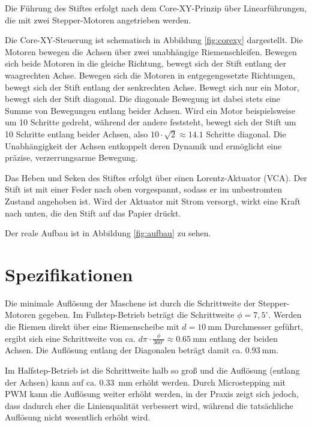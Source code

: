 \documentclass[a4paper,twoside,12pt,DIV=13,BCOR=5mm,numbers=noenddot,cleardoublepage=empty]{scrbook}
\begin{document}
Die Führung des Stiftes erfolgt nach dem Core-XY-Prinzip über Linearführungen, die mit zwei Stepper-Motoren angetrieben werden.

Die Core-XY-Steuerung ist schematisch in Abbildung \ref{fig:corexy} dargestellt. Die Motoren bewegen die Achsen über zwei unabhängige Riemenschleifen.
Bewegen sich beide Motoren in die gleiche Richtung, bewegt sich der Stift entlang der waagrechten Achse.
Bewegen sich die Motoren in entgegengesetzte Richtungen, bewegt sich der Stift entlang der senkrechten Achse.
Bewegt sich nur ein Motor, bewegt sich der Stift diagonal.
Die diagonale Bewegung ist dabei stets eine Summe von Bewegungen entlang beider Achsen.
Wird ein Motor beispielsweise um 10 Schritte gedreht, während der andere feststeht, bewegt sich der Stift um 10 Schritte entlang beider Achsen,
also $10\cdot\sqrt{2}\approx 14.1$ Schritte diagonal.
Die Unabhängigkeit der Achsen entkoppelt deren Dynamik und ermöglicht eine präzise, verzerrungsarme Bewegung.

Das Heben und Seken des Stiftes erfolgt über einen Lorentz-Aktuator (VCA). Der Stift ist mit einer Feder nach oben vorgespannt, sodass er im unbestromten Zustand angehoben ist.
Wird der Aktuator mit Strom versorgt, wirkt eine Kraft nach unten, die den Stift auf das Papier drückt.

Der reale Aufbau ist in Abbildung \ref{fig:aufbau} zu sehen.



\chapter{Spezifikationen}

Die minimale Auflösung der Maschene ist durch die Schrittweite der Stepper-Motoren gegeben. Im Fullstep-Betrieb beträgt die Schrittweite $\phi=7,5^{\circ}$.
Werden die Riemen direkt über eine Riemenscheibe mit $d=\qty{10}{\milli\meter}$ Durchmesser geführt, ergibt sich eine Schrittweite von ca. $d\pi\cdot\frac{\phi}{360^\circ}\approx \qty{0.65}{\milli\meter}$ entlang der beiden Achsen.
Die Auflösung entlang der Diagonalen beträgt damit ca. $\qty{0.93}{\milli\meter}$.

Im Halfstep-Betrieb ist die Schrittweite halb so groß und die Auflösung (entlang der Achsen) kann auf ca. \qty{0.33}{\milli\meter} erhöht werden.
Durch Microstepping mit PWM kann die Auflösung weiter erhöht werden, in der Praxis zeigt sich jedoch, dass dadurch eher die Linienqualität verbessert wird, während die tatsächliche Auflösung nicht wesentlich erhöht wird.
\end{document}
